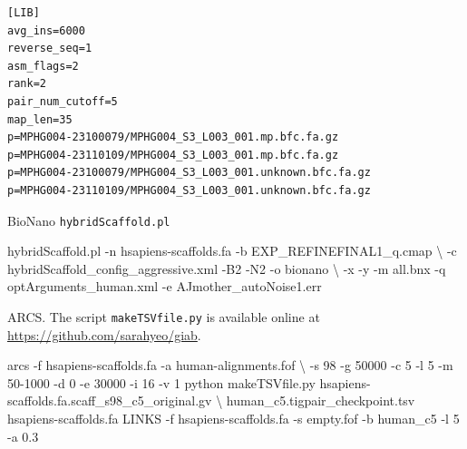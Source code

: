 \documentclass[
  12pt,
  oneside,
  openany]{book}
\newenvironment{Shaded}{}{}
\newcommand{\ExtensionTok}[1]{#1}
\newcommand{\NormalTok}[1]{#1}
\begin{document}
\begin{appendices}
\begin{codelisting}
\begin{verbatim}
[LIB]
avg_ins=6000
reverse_seq=1
asm_flags=2
rank=2
pair_num_cutoff=5
map_len=35
p=MPHG004-23100079/MPHG004_S3_L003_001.mp.bfc.fa.gz
p=MPHG004-23110109/MPHG004_S3_L003_001.mp.bfc.fa.gz
p=MPHG004-23100079/MPHG004_S3_L003_001.unknown.bfc.fa.gz
p=MPHG004-23110109/MPHG004_S3_L003_001.unknown.bfc.fa.gz
\end{verbatim}

\end{codelisting}

\begin{codelisting}

\caption[BioNano \texttt{hybridScaffold.pl}]{BioNano \texttt{hybridScaffold.pl}}

\hypertarget{lst:bionano}{%
\label{lst:bionano}}%
\begin{Shaded}
\begin{Highlighting}[]
\ExtensionTok{hybridScaffold.pl}\NormalTok{ -n hsapiens-scaffolds.fa -b EXP_REFINEFINAL1_q.cmap \textbackslash{}}
\NormalTok{    -c hybridScaffold_config_aggressive.xml -B2 -N2 -o bionano \textbackslash{}}
\NormalTok{    -x -y -m all.bnx -q optArguments_human.xml -e AJmother_autoNoise1.err}
\end{Highlighting}
\end{Shaded}

\end{codelisting}

\begin{codelisting}

\caption[ARCS.]{ARCS. The script \texttt{makeTSVfile.py} is available online at \url{https://github.com/sarahyeo/giab}.}

\hypertarget{lst:arcs}{%
\label{lst:arcs}}%
\begin{Shaded}
\begin{Highlighting}[]
\ExtensionTok{arcs}\NormalTok{ -f hsapiens-scaffolds.fa -a human-alignments.fof \textbackslash{}}
\NormalTok{    -s 98 -g 50000 -c 5 -l 5 -m 50-1000 -d 0 -e 30000 -i 16 -v 1}
\ExtensionTok{python}\NormalTok{ makeTSVfile.py hsapiens-scaffolds.fa.scaff_s98_c5_original.gv \textbackslash{}}
\NormalTok{    human_c5.tigpair_checkpoint.tsv hsapiens-scaffolds.fa}
\ExtensionTok{LINKS}\NormalTok{ -f hsapiens-scaffolds.fa -s empty.fof -b human_c5 -l 5 -a 0.3}
\end{Highlighting}
\end{Shaded}

\end{codelisting}

\clearpage


\end{appendices}
\end{document}
